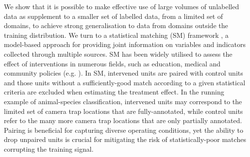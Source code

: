 We show that it is possible to make effective use of large volumes of unlabelled data
as supplement to a smaller set of labelled data, from a limited set of domains, to achieve
strong generalisation to data from domains outside the training distribution.
%
We turn to a statistical matching (SM) framework \cite{RomInsShaQua22,rosenbaum1985constructing, rubin1973matching}, a model-based approach for providing joint information on variables and
indicators collected through multiple sources. 
%
SM has been widely utilised to assess the effect of interventions in numerous fields, such as
education, medical and community policies (e.g. \cite{biglan2000value, christian2010prenatal}).  
%
In SM, intervened units are paired with control units and those units without a sufficiently-good
match according to a given statistical criteria are excluded when estimating the treatment effect.
%
In the running example of animal-species classification, intervened units may correspond to the
limited set of camera trap locations that are fully-annotated, while control units refer to the
many more camera trap locations that are only partially annotated.
%
Pairing is beneficial for capturing diverse operating conditions, yet the ability to drop unpaired
units is crucial for mitigating the risk of statistically-poor matches corrupting the training
signal.

